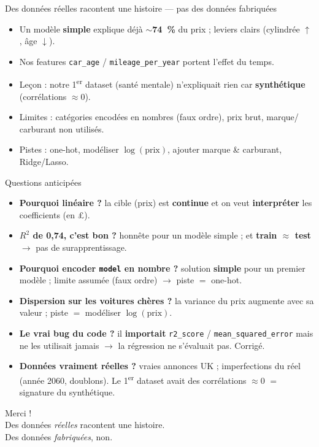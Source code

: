 \documentclass[aspectratio=169,11pt]{beamer}
\begin{document}
\begin{frame}{Des données réelles racontent une histoire --- pas des données fabriquées}
  \begin{itemize}
    \item Un modèle \textbf{simple} explique déjà \textbf{$\sim$74~\%} du prix ; leviers
      clairs (cylindrée $\uparrow$, âge $\downarrow$).
    \item Nos features \texttt{car\_age} / \texttt{mileage\_per\_year} portent l'effet du
      temps.
    \item Leçon : notre 1\textsuperscript{er} dataset (santé mentale) n'expliquait rien
      car \textbf{synthétique} (corrélations $\approx 0$).
    \item Limites : catégories encodées en nombres (faux ordre), prix brut, marque/
      carburant non utilisés.
    \item Pistes : one-hot, modéliser \textbf{$\log(\text{prix})$}, ajouter marque \&
      carburant, Ridge/Lasso.
  \end{itemize}
\end{frame}

\begin{frame}{Questions anticipées}
  \footnotesize
  \begin{itemize}
    \item \textbf{Pourquoi linéaire ?} la cible (prix) est \textbf{continue} et on veut
      \textbf{interpréter} les coefficients (en £).
    \item \textbf{$R^2$ de 0,74, c'est bon ?} honnête pour un modèle simple ; et
      \textbf{train $\approx$ test} $\to$ pas de surapprentissage.
    \item \textbf{Pourquoi encoder \texttt{model} en nombre ?} solution \textbf{simple}
      pour un premier modèle ; limite assumée (faux ordre) $\to$ piste $=$ one-hot.
    \item \textbf{Dispersion sur les voitures chères ?} la variance du prix augmente avec
      sa valeur ; piste $=$ modéliser \textbf{$\log(\text{prix})$}.
    \item \textbf{Le vrai bug du code ?} il \textbf{importait} \texttt{r2\_score} /
      \texttt{mean\_squared\_error} mais ne les utilisait jamais $\to$ la régression ne
      s'évaluait pas. Corrigé.
    \item \textbf{Données vraiment réelles ?} vraies annonces UK ; imperfections du réel
      (année 2060, doublons). Le 1\textsuperscript{er} dataset avait des corrélations
      $\approx 0$ $=$ signature du synthétique.
  \end{itemize}
\end{frame}

\begin{frame}[standout]
  Merci !\\[0.5em]
  \small Des données \emph{réelles} racontent une histoire.\\
  \small Des données \emph{fabriquées}, non.
\end{frame}
\end{document}
